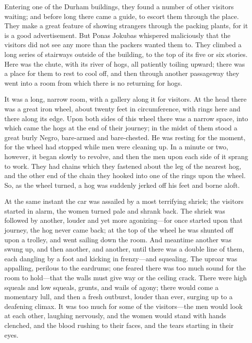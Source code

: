 \documentclass[
]{article}
\begin{document}
Entering one of the Durham buildings, they found a number of other visitors waiting; and before long there came a guide, to escort them through the place. They make a great feature of showing strangers through the packing plants, for it is a good advertisement. But Ponas Jokubas whispered maliciously that the visitors did not see any more than the packers wanted them to. They climbed a long series of stairways outside of the building, to the top of its five or six stories. Here was the chute, with its river of hogs, all patiently toiling upward; there was a place for them to rest to cool off, and then through another passageway they went into a room from which there is no returning for hogs.

It was a long, narrow room, with a gallery along it for visitors. At the head there was a great iron wheel, about twenty feet in circumference, with rings here and there along its edge. Upon both sides of this wheel there was a narrow space, into which came the hogs at the end of their journey; in the midst of them stood a great burly Negro, bare-armed and bare-chested. He was resting for the moment, for the wheel had stopped while men were cleaning up. In a minute or two, however, it began slowly to revolve, and then the men upon each side of it sprang to work. They had chains which they fastened about the leg of the nearest hog, and the other end of the chain they hooked into one of the rings upon the wheel. So, as the wheel turned, a hog was suddenly jerked off his feet and borne aloft.

At the same instant the car was assailed by a most terrifying shriek; the visitors started in alarm, the women turned pale and shrank back. The shriek was followed by another, louder and yet more agonizing---for once started upon that journey, the hog never came back; at the top of the wheel he was shunted off upon a trolley, and went sailing down the room. And meantime another was swung up, and then another, and another, until there was a double line of them, each dangling by a foot and kicking in frenzy---and squealing. The uproar was appalling, perilous to the eardrums; one feared there was too much sound for the room to hold---that the walls must give way or the ceiling crack. There were high squeals and low squeals, grunts, and wails of agony; there would come a momentary lull, and then a fresh outburst, louder than ever, surging up to a deafening climax. It was too much for some of the visitors---the men would look at each other, laughing nervously, and the women would stand with hands clenched, and the blood rushing to their faces, and the tears starting in their eyes.
\end{document}
